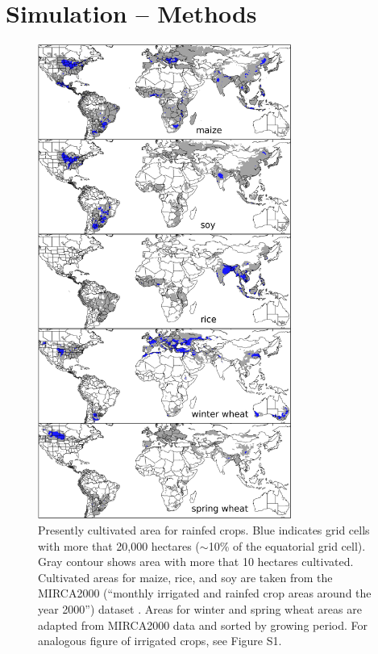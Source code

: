 \documentclass[gmd, manuscript]{copernicus} %
\begin{document}
\section{Simulation -- Methods}
\label{S:2}

\begin{figure}[ht]
\centering
   \includegraphics[width=8.3cm]{figures/croparea.png}
   \caption{Presently cultivated area for rainfed crops. Blue indicates grid cells with more that 20,000 hectares ($\sim$10\% of the equatorial grid cell). Gray contour shows area with more that 10 hectares cultivated. Cultivated areas for maize, rice, and soy are taken from the MIRCA2000 (``monthly irrigated and rainfed crop areas around the year 2000'') dataset \citep{Portmann2010}. Areas for winter and spring wheat areas are adapted from MIRCA2000 data and sorted by growing period. For analogous figure of irrigated crops, see Figure S1.}
   \label{fig:crop_area}
\end{figure}
\end{document}
